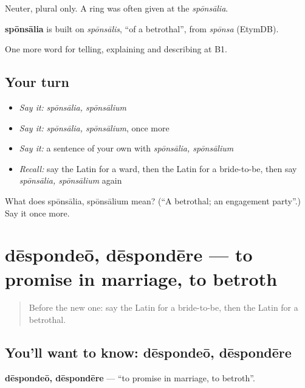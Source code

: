 Neuter, plural only. A ring was often given at the \emph{spōnsālia}.

\begin{cousinweb}
\textbf{spōnsālia} is built on \emph{spōnsālis}, \textquotedblleft{}of a betrothal\textquotedblright{}, from \emph{spōnsa} (EtymDB).
\end{cousinweb}

\begin{grammarlens}[title={What you've built}]
One more word for telling, explaining and describing at B1.
\end{grammarlens}

\subsection*{Your turn}
\begin{itemize}
\raggedright
  \item \emph{Say it:} \emph{spōnsālia, spōnsālium}
  \item \emph{Say it:} \emph{spōnsālia, spōnsālium}, once more
  \item \emph{Say it:} a sentence of your own with \emph{spōnsālia, spōnsālium}
  \item \emph{Recall:} say the Latin for a ward, then the Latin for a bride-to-be, then say \emph{spōnsālia, spōnsālium} again
\end{itemize}

\begin{tcolorbox}[breakable,colback=teal!4,colframe=teal!35!black,title={Before you move on}]
What does spōnsālia, spōnsālium mean? (\textquotedblleft{}A betrothal; an engagement party\textquotedblright{}.) Say it once more.
\end{tcolorbox}
\section[dēspondeō, dēspondēre]{dēspondeō, dēspondēre — to promise in marriage, to betroth}

\label{lesson:LA-C327-despondeo}



\begin{quote}
Before the new one: say the Latin for a bride-to-be, then the Latin for a betrothal.
\end{quote}

\subsection*{You'll want to know: dēspondeō, dēspondēre}
\textbf{dēspondeō, dēspondēre} — \textquotedblleft{}to promise in marriage, to betroth\textquotedblright{}.

